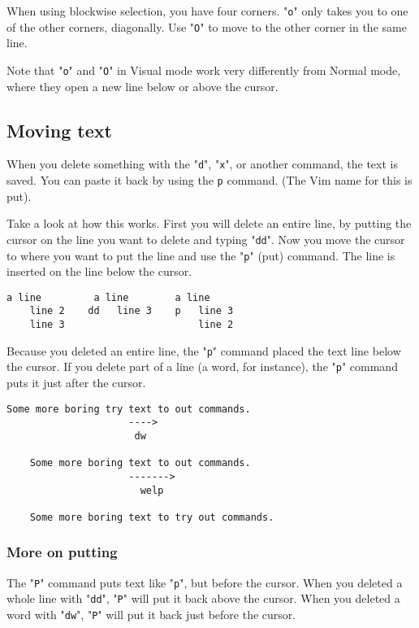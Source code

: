 When using blockwise selection, you have four corners.
"\texttt{o}" only takes you to one of the other corners, diagonally.
Use "\texttt{O}" to move to the other corner in the same line.

Note that "\texttt{o}" and "\texttt{O}" in Visual mode work very differently from Normal mode, where they open a new line below or above the cursor.

\subsection{Moving text}

When you delete something with the "\texttt{d}", "\texttt{x}", or another command, the text is saved.
You can paste it back by using the \texttt{p} command.
(The Vim name for this is put).

Take a look at how this works.
First you will delete an entire line, by putting the cursor on the line you want to delete and typing "\texttt{dd}".
Now you move the cursor to where you want to put the line and use the "\texttt{p}" (put) command.
The line is inserted on the line below the cursor.

\begin{Verbatim}[samepage=true]
    a line         a line        a line
    line 2    dd   line 3    p   line 3
    line 3                       line 2
\end{Verbatim}

Because you deleted an entire line, the "\texttt{p}" command placed the text line below the cursor.
If you delete part of a line (a word, for instance), the "\texttt{p}" command puts it just after the cursor.

\begin{Verbatim}[samepage=true]
    Some more boring try text to out commands. 
                     ---->
                      dw

    Some more boring text to out commands. 
                     ------->
                       welp

    Some more boring text to try out commands. 
\end{Verbatim}

\subsubsection{More on putting}

The "\texttt{P}" command puts text like "\texttt{p}", but before the cursor.
When you deleted a whole line with "\texttt{dd}", "\texttt{P}" will put it back above the cursor.
When you deleted a word with "\texttt{dw}", "\texttt{P}" will put it back just before the cursor.


